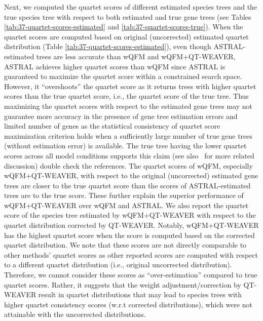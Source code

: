 \documentclass[10pt,a4paper]{article}
\newcommand{\addb}[1]{{\color{red} #1}}
\begin{document}
Next, we computed the quartet scores of different estimated species trees and the true species tree with respect to both estimated and true gene trees (see Tables \ref{tab:37-quartet-scores-estimated} and \ref{tab:37-quartet-scores-true}). When the quartet scores are computed based on original (uncorrected) estimated quartet distribution (Table \ref{tab:37-quartet-scores-estimated}), even though ASTRAL-estimated trees are less accurate than wQFM and wQFM+QT-WEAVER, ASTRAL achieves higher quartet scores than wQFM since ASTRAL is guaranteed to maximize the quartet score within a constrained search space. However, it ``overshoots'' the quartet score as it returns trees with higher quartet scores than the true quartet score, i.e., the quartet score of the true tree. Thus maximizing the quartet scores with respect to the estimated gene trees may not guarantee more accuracy in the presence of gene tree estimation errors and limited number of genes as the statistical consistency of quartet score maximization criterion holds when a sufficiently large number of true gene trees (without estimation error) is available. The true tree having the lower quartet scores across all model conditions supports this claim (see also~\cite{spterrace,farah2020phylogenomic,navidsbiorxiv-paper} for more related discussion) \addb{double check the references}. %
The quartet scores of wQFM, especially wQFM+QT-WEAVER, with respect to the original (uncorrected) estimated gene trees are closer to the true quartet score than the scores of ASTRAL-estimated trees are to the true score. These further explain the superior performance of wQFM+QT-WEAVER over wQFM and ASTRAL. We also report the quartet score of the species tree estimated by wQFM+QT-WEAVER with respect to the quartet distribution corrected by QT-WEAVER. Notably, wQFM+QT-WEAVER has the highest quartet score when the score is computed based on the corrected quartet distribution. We note that these scores are not directly comparable to other methods' quartet scores as other reported scores are computed with respect to a different quartet distribution (i.e., original uncorrected distribution). Therefore, we cannot consider these scores as ``over-estimation'' compared to true quartet scores. Rather, it suggests that the weight adjustment/correction by QT-WEAVER result in quartet distributions that may lead to species trees with higher quartet consistency scores (w.r.t  corrected distributions), which were not attainable with the uncorrected distributions.
\end{document}

